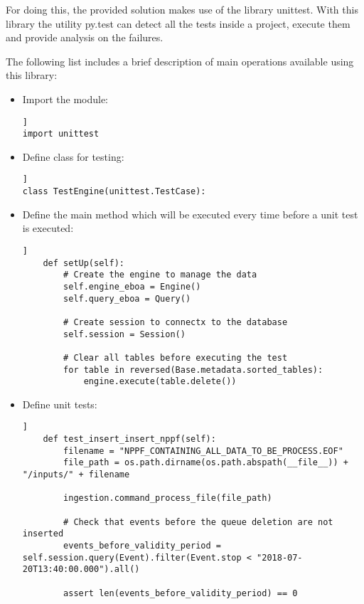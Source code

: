 For doing this, the provided solution makes use of the library unittest. With this library the utility py.test can detect all the tests inside a project, execute them and provide analysis on the failures.

The following list includes a brief description of main operations available using this library:

\begin{itemize}
\item Import the module:
\begin{lstlisting}[breaklines=true, style=python]]
import unittest
\end{lstlisting}
\item Define class for testing:
\begin{lstlisting}[breaklines=true, style=python]]
class TestEngine(unittest.TestCase):
\end{lstlisting}
\item Define the main method which will be executed every time before a unit test is executed:
\begin{lstlisting}[breaklines=true, style=python]]
    def setUp(self):
        # Create the engine to manage the data
        self.engine_eboa = Engine()
        self.query_eboa = Query()

        # Create session to connectx to the database
        self.session = Session()

        # Clear all tables before executing the test
        for table in reversed(Base.metadata.sorted_tables):
            engine.execute(table.delete())
\end{lstlisting}
\item Define unit tests:
\begin{lstlisting}[breaklines=true, style=python]]
    def test_insert_insert_nppf(self):
        filename = "NPPF_CONTAINING_ALL_DATA_TO_BE_PROCESS.EOF"
        file_path = os.path.dirname(os.path.abspath(__file__)) + "/inputs/" + filename

        ingestion.command_process_file(file_path)

        # Check that events before the queue deletion are not inserted
        events_before_validity_period = self.session.query(Event).filter(Event.stop < "2018-07-20T13:40:00.000").all()

        assert len(events_before_validity_period) == 0
\end{lstlisting}
\end{itemize}
